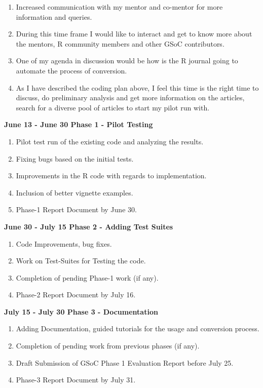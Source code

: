 \documentclass[12pt]{article}
\begin{document}
\begin{enumerate}[label = {  \color{MediumBlue} \textbf{\arabic*. }},align=left]
\item Increased communication with my mentor and co-mentor for more information and queries.
\item During this time frame I would like to interact and get to know more about the mentors, R community members and other GSoC contributors. 
\item One of my agenda in discussion would be how is the R journal going to automate the process of conversion.
\item As I have described the coding plan above, I feel this time is the right time to discuss, do preliminary analysis and get more information on the articles, search for a diverse pool of articles to start my pilot run with. 
 \end{enumerate}
{\large\bfseries  {\color{orange}June 13 - June 30} Phase 1 - Pilot Testing}
\begin{enumerate}[label = {  \color{MediumBlue} \textbf{\arabic*. }},align=left]
\item Pilot test run of the existing code and analyzing the results.
\item Fixing bugs based on the initial tests.
\item Improvements in the R code with regards to implementation.
\item Inclusion of better vignette examples. 
\item Phase-1 Report Document by June 30.
\end{enumerate}
{\large\bfseries {\color{orange}June 30 - July 15} Phase 2 - Adding Test Suites}
\begin{enumerate}[label = {  \color{MediumBlue} \textbf{\arabic*. }},align=left]
\item Code Improvements, bug fixes.
\item Work on Test-Suites for Testing the code.
\item Completion of pending Phase-1 work (if any).
\item Phase-2 Report Document by July 16.
\end{enumerate}
{\large\bfseries {\color{orange}July 15 - July 30} Phase 3 - Documentation}
\begin{enumerate}[label = {  \color{MediumBlue} \textbf{\arabic*. }},align=left]
\item Adding Documentation, guided tutorials for the usage and conversion process.
\item Completion of pending work from previous phases (if any). 
\item Draft Submission of GSoC Phase 1 Evaluation Report before July 25.
\item Phase-3 Report Document by July 31.
\end{enumerate}
\end{document}
